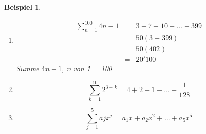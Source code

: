 \documentclass[a4paper,10pt]{report}
\newtheorem{myexample}{Beispiel}
\begin{document}
\begin{myexample}
	\begin{enumerate}
		\item
			\begin{eqnarray*}
				\sum_{n=1}^{100} 4n-1 &=& 3+7+10+\ldots+399\\
				&=& 50(3+399)\\
				&=& 50(402)\\
				&=& 20'100
			\end{eqnarray*}
			Summe $4n-1$, n von 1 = 100
		\item
			\begin{equation*}
				\sum_{k=1}^{10} 2^{3-k} = 4 + 2 + 1 + \ldots + \frac{1}{128}
			\end{equation*}
		\item
			\begin{equation*}
				\sum_{j=1}^{5} ajx^j  = a_1x + a_2x^2 + \ldots + a_5x^5
			\end{equation*}			
	\end{enumerate}
\end{myexample}
\newpage
\end{document}
